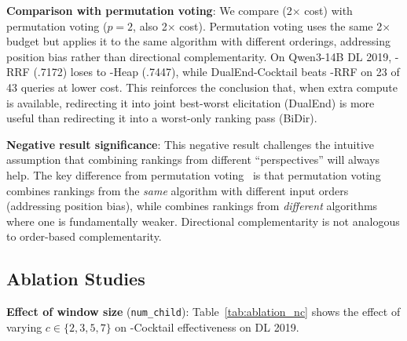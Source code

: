 \textbf{Comparison with permutation voting}: We compare \bidir{} (2$\times$ cost) with permutation voting ($p=2$, also 2$\times$ cost). Permutation voting uses the same 2$\times$ budget but applies it to the same algorithm with different orderings, addressing position bias rather than directional complementarity. On Qwen3-14B DL 2019, \bidir{}-RRF (.7172) loses to \topdown{}-Heap (.7447), while DualEnd-Cocktail beats \bidir{}-RRF on 23 of 43 queries at lower cost. This reinforces the conclusion that, when extra compute is available, redirecting it into joint best-worst elicitation (DualEnd) is more useful than redirecting it into a worst-only ranking pass (BiDir).

\textbf{Negative result significance}: This negative result challenges the intuitive assumption that combining rankings from different ``perspectives'' will always help. The key difference from permutation voting~\citep{zhuang2024setwise} is that permutation voting combines rankings from the \emph{same} algorithm with different input orders (addressing position bias), while \bidir{} combines rankings from \emph{different} algorithms where one is fundamentally weaker. Directional complementarity is not analogous to order-based complementarity.


\subsection{Ablation Studies}
\label{sec:ablation}

\textbf{Effect of window size} (\texttt{num\_child}): Table~\ref{tab:ablation_nc} shows the effect of varying $c \in \{2, 3, 5, 7\}$ on \dualend{}-Cocktail effectiveness on DL 2019.

\begin{table}[!htbp]
\caption{Effect of \texttt{num\_child} ($c$) on \dualend{}-Cocktail (DL 2019). Optimal $c$ depends on model family.}
\label{tab:ablation_nc}
\small
{}
\end{table}

